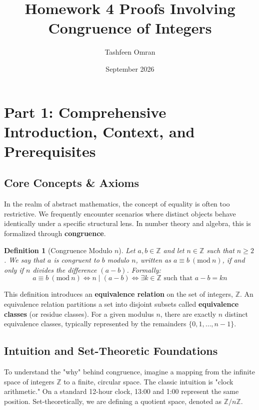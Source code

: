 \documentclass[11pt]{article}
\title{\textbf{Homework 4 Proofs Involving Congruence of Integers}}
\author{Tashfeen Omran}
\date{September 2026}
\newtheorem{definition}{Definition}[section]
\newcommand{\Z}{\mathbb{Z}}
\newcommand{\modulo}[1]{\ (\mathrm{mod}\ #1)}
\begin{document}
\maketitle
\tableofcontents
\newpage

\section{Part 1: Comprehensive Introduction, Context, and Prerequisites}

\subsection{Core Concepts \& Axioms}
In the realm of abstract mathematics, the concept of equality is often too restrictive. We frequently encounter scenarios where distinct objects behave identically under a specific structural lens. In number theory and algebra, this is formalized through \textbf{congruence}. 

\begin{definition}[Congruence Modulo $n$]
Let $a, b \in \Z$ and let $n \in \Z$ such that $n \geq 2$. We say that $a$ is congruent to $b$ modulo $n$, written as $a \equiv b \modulo{n}$, if and only if $n$ divides the difference $(a - b)$. Formally:
\[ a \equiv b \modulo{n} \iff n \mid (a - b) \iff \exists k \in \Z \text{ such that } a - b = kn \]
\end{definition}

This definition introduces an \textbf{equivalence relation} on the set of integers, $\Z$. An equivalence relation partitions a set into disjoint subsets called \textbf{equivalence classes} (or residue classes). For a given modulus $n$, there are exactly $n$ distinct equivalence classes, typically represented by the remainders $\{0, 1, \dots, n-1\}$.

\subsection{Intuition and Set-Theoretic Foundations}
To understand the "why" behind congruence, imagine a mapping from the infinite space of integers $\Z$ to a finite, circular space. The classic intuition is "clock arithmetic." On a standard 12-hour clock, 13:00 and 1:00 represent the same position. Set-theoretically, we are defining a quotient space, denoted as $\Z/n\Z$. 
\end{document}
